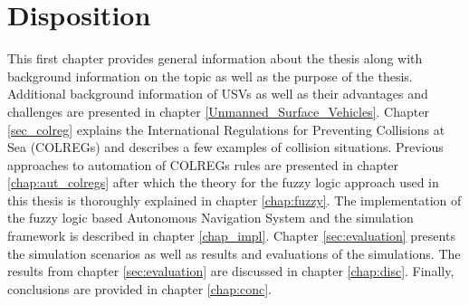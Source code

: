 \section{Disposition}
This first chapter  provides  general information about the thesis along with background information on the topic as well as
the purpose of the thesis. Additional background information of USVs as well as their advantages and challenges are presented in chapter \ref{Unmanned_Surface_Vehicles}. Chapter \ref{sec_colreg} explains the International Regulations for Preventing Collisions
at Sea (COLREGs) and describes a few examples of collision situations.  Previous approaches to automation of COLREGs rules are presented in chapter \ref{chap:aut_colregs} after which the theory for the fuzzy logic approach used in this thesis is thoroughly explained in chapter \ref{chap:fuzzy}. The implementation of the fuzzy logic based Autonomous Navigation System and the simulation framework is described in chapter \ref{chap_impl}. Chapter \ref{sec:evaluation} presents the simulation scenarios as well as results and evaluations of the simulations. The results from chapter \ref{sec:evaluation} are discussed in chapter \ref{chap:disc}. Finally, conclusions are provided in chapter \ref{chap:conc}.